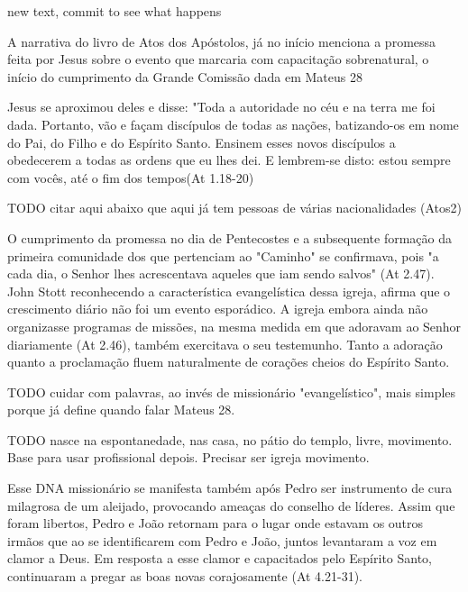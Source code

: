 \documentclass[
	12pt,				%
	openright,			%
	twoside,			%
	a4paper,			%
	english,			%
	french,				%
	spanish,			%
	brazil				%
	]{abntex2}
\begin{document}

new text, commit to see what happens 


A narrativa do livro de Atos dos Apóstolos, já no início menciona a promessa feita por Jesus sobre o evento que marcaria com capacitação sobrenatural, o início do cumprimento da Grande Comissão dada em Mateus 28
\begin{citacao}
Jesus se aproximou deles e disse: "Toda a autoridade no céu e na terra me foi dada. Portanto, vão e façam discípulos de todas as nações, batizando-os em nome do Pai, do Filho e do Espírito Santo. Ensinem esses novos discípulos a obedecerem a todas as ordens que eu lhes dei. E lembrem-se disto: estou sempre com vocês, até o fim dos tempos(At 1.18-20)
\end{citacao}

TODO citar aqui abaixo que aqui já tem pessoas de várias nacionalidades (Atos2)

O cumprimento da promessa no dia de Pentecostes e a subsequente formação da primeira comunidade dos que pertenciam ao "Caminho" se confirmava, pois "a cada dia, o Senhor lhes acrescentava aqueles que iam sendo salvos" (At 2.47). John Stott reconhecendo a característica evangelística dessa igreja, afirma que o crescimento diário não foi um evento esporádico. A igreja embora ainda não organizasse programas de missões, na mesma medida em que adoravam ao Senhor diariamente (At 2.46), também exercitava o seu testemunho. Tanto a adoração quanto a proclamação fluem naturalmente de corações cheios do Espírito Santo. \cite[118-119]{stott}

TODO cuidar com palavras, ao invés de missionário "evangelístico", mais simples porque já define quando falar Mateus 28.

TODO nasce na espontanedade, nas casa, no pátio do templo, livre, movimento. Base para usar profissional depois. Precisar ser igreja movimento.

Esse DNA missionário se manifesta também após Pedro ser instrumento de cura milagrosa de um aleijado, provocando ameaças do conselho de líderes. Assim que foram libertos, Pedro e João retornam para o lugar onde estavam os outros irmãos que ao se identificarem com Pedro e João, juntos levantaram a voz em clamor a Deus. Em resposta a esse clamor e capacitados pelo Espírito Santo, continuaram a pregar as boas novas corajosamente (At 4.21-31).
\end{document}
